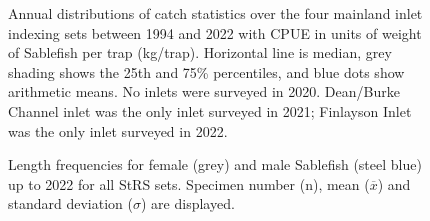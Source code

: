 \documentclass[12pt]{article}\usepackage[]{graphicx}\usepackage[]{color}
\begin{document}
\begin{figure}[htb]

{\centering {} 

}

\caption{Annual distributions of catch statistics over the four mainland inlet indexing sets between 1994 and 2022 with CPUE in units of weight of Sablefish per trap (kg/trap). Horizontal line is median, grey shading shows the 25th and 75\% percentiles, and blue dots show arithmetic means. No inlets were surveyed in 2020. Dean/Burke Channel inlet was the only inlet surveyed in 2021; Finlayson Inlet was the only inlet surveyed in 2022.}\label{fig:figure10}
\end{figure}
\clearpage


\begin{figure}[htb]

{\centering {} 

}

\caption{Length frequencies for female (grey) and male Sablefish (steel blue) up to 2022 for all StRS sets. Specimen number (n), mean (\(\overline{x}\)) and standard deviation (\(\sigma\)) are displayed.}\label{fig:figure11}
\end{figure}
\end{document}
